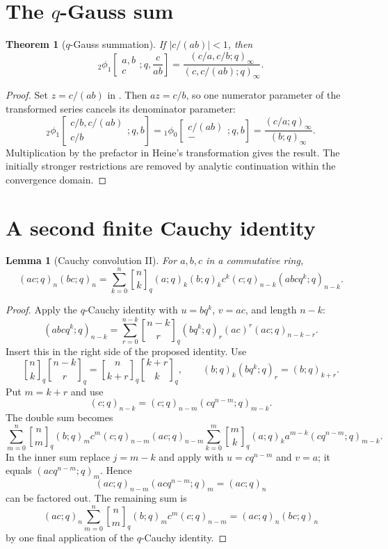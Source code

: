 \documentclass[11pt,oneside,openany]{book}
\newtheorem{theorem}{Theorem}[chapter]
\newtheorem{lemma}[lemma]{Lemma}
\theoremstyle{definition}
\theoremstyle{remark}
\newcommand{\qbinom}[2]{\genfrac{[}{]}{0pt}{}{#1}{#2}_{q}}
\newcommand{\abs}[1]{\lvert #1\rvert}
\begin{document}
\section{The \texorpdfstring{$q$}{q}-Gauss sum}

\begin{theorem}[$q$-Gauss summation]\label{thm:q-gauss}
If $\abs{c/(ab)}<1$, then
\[
 {}_2\phi_1\!\left[
 \begin{matrix}a,b\\c\end{matrix};q,\frac{c}{ab}\right]
 =\frac{(c/a,c/b;q)_\infty}{(c,c/(ab);q)_\infty}.
\]
\end{theorem}

\begin{proof}
Set $z=c/(ab)$ in .  Then $az=c/b$, so one numerator parameter of the transformed series cancels its denominator parameter:
\[
 {}_2\phi_1\!\left[\begin{matrix}c/b,c/(ab)\\c/b\end{matrix};q,b\right]
 ={}_1\phi_0\!\left[\begin{matrix}c/(ab)\\-\end{matrix};q,b\right]
 =\frac{(c/a;q)_\infty}{(b;q)_\infty}.
\]
Multiplication by the prefactor in Heine's transformation gives the result.  The initially stronger restrictions are removed by analytic continuation within the convergence domain.
\end{proof}

\section{A second finite Cauchy identity}

\begin{lemma}[Cauchy convolution II]\label{lem:cauchy-II}
For $a,b,c$ in a commutative ring,
\[
 (ac;q)_n(bc;q)_n
 =\sum_{k=0}^{n}\qbinom nk
 (a;q)_k(b;q)_k c^k(c;q)_{n-k}(abcq^k;q)_{n-k}.
\]
\end{lemma}

\begin{proof}
Apply the $q$-Cauchy identity  with $u=bq^k$, $v=ac$, and length $n-k$:
\[
 (abcq^k;q)_{n-k}
 =\sum_{r=0}^{n-k}\qbinom{n-k}{r}
 (bq^k;q)_r(ac)^r(ac;q)_{n-k-r}.
\]
Insert this in the right side of the proposed identity.  Use
\[
 \qbinom nk\qbinom{n-k}{r}
 =\qbinom n{k+r}\qbinom{k+r}k,
 \qquad
 (b;q)_k(bq^k;q)_r=(b;q)_{k+r}.
\]
Put $m=k+r$ and use
\[
 (c;q)_{n-k}=(c;q)_{n-m}(cq^{n-m};q)_{m-k}.
\]
The double sum becomes
\[
 \sum_{m=0}^{n}\qbinom nm(b;q)_m c^m(c;q)_{n-m}(ac;q)_{n-m}
 \sum_{k=0}^{m}\qbinom mk(a;q)_k a^{m-k}
 (cq^{n-m};q)_{m-k}.
\]
In the inner sum replace $j=m-k$ and apply  with $u=cq^{n-m}$ and $v=a$; it equals $(acq^{n-m};q)_m$.  Hence
\[
 (ac;q)_{n-m}(acq^{n-m};q)_m=(ac;q)_n
\]
can be factored out.  The remaining sum is
\[
 (ac;q)_n\sum_{m=0}^{n}\qbinom nm(b;q)_m c^m(c;q)_{n-m}
 =(ac;q)_n(bc;q)_n
\]
by one final application of the $q$-Cauchy identity.
\end{proof}
\end{document}
